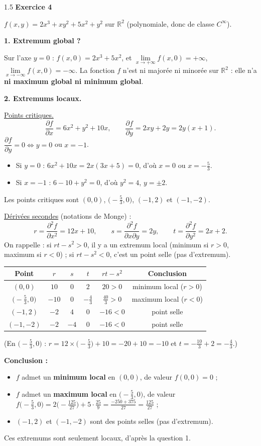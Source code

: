 \documentclass[12pt]{article}
\begin{document}
\begin{spacing}{1.5}
\medskip\textbf{Exercice 4}

$f(x,y)=2x^3+xy^2+5x^2+y^2$ sur $\mathbb{R}^2$ (polynomiale, donc de classe $C^\infty$).

\textbf{1. Extremum global ?}

Sur l'axe $y=0$ : $f(x,0)=2x^3+5x^2$, et $\lim\limits_{x\to+\infty}f(x,0)=+\infty$, $\lim\limits_{x\to-\infty}f(x,0)=-\infty$. La fonction $f$ n'est ni majorée ni minorée sur $\mathbb{R}^2$ : elle n'a \textbf{ni maximum global ni minimum global}.

\textbf{2. Extremums locaux.}

\underline{Points critiques.}
\[
\frac{\partial f}{\partial x}=6x^2+y^2+10x,\qquad \frac{\partial f}{\partial y}=2xy+2y=2y(x+1).
\]
$\dfrac{\partial f}{\partial y}=0\iff y=0$ ou $x=-1$.
\begin{itemize}
\item Si $y=0$ : $6x^2+10x=2x(3x+5)=0$, d'où $x=0$ ou $x=-\frac53$.
\item Si $x=-1$ : $6-10+y^2=0$, d'où $y^2=4$, $y=\pm2$.
\end{itemize}
Les points critiques sont $(0,0)$, $\big(-\frac53,0\big)$, $(-1,2)$ et $(-1,-2)$.

\underline{Dérivées secondes} (notations de Monge) :
\[
r=\frac{\partial^2f}{\partial x^2}=12x+10,\qquad s=\frac{\partial^2f}{\partial x\partial y}=2y,\qquad t=\frac{\partial^2f}{\partial y^2}=2x+2 .
\]
On rappelle : si $rt-s^2>0$, il y a un extremum local (minimum si $r>0$, maximum si $r<0$) ; si $rt-s^2<0$, c'est un point selle (pas d'extremum).

\begin{center}
\begin{tabular}{|c|c|c|c|c|c|}
\hline
Point & $r$ & $s$ & $t$ & $rt-s^2$ & Conclusion\\
\hline
$(0,0)$ & $10$ & $0$ & $2$ & $20>0$ & minimum local ($r>0$)\\
\hline
$\big(-\frac53,0\big)$ & $-10$ & $0$ & $-\frac43$ & $\frac{40}{3}>0$ & maximum local ($r<0$)\\
\hline
$(-1,2)$ & $-2$ & $4$ & $0$ & $-16<0$ & point selle\\
\hline
$(-1,-2)$ & $-2$ & $-4$ & $0$ & $-16<0$ & point selle\\
\hline
\end{tabular}
\end{center}
(En $\big(-\frac53,0\big)$ : $r=12\times\big(-\frac53\big)+10=-20+10=-10$ et $t=-\frac{10}{3}+2=-\frac43$.)

\textbf{Conclusion :}
\begin{itemize}
\item $f$ admet un \textbf{minimum local} en $(0,0)$, de valeur $f(0,0)=0$ ;
\item $f$ admet un \textbf{maximum local} en $\big(-\frac53,0\big)$, de valeur $f\big(-\frac53,0\big)=2\big(-\frac{125}{27}\big)+5\cdot\frac{25}{9}=\frac{-250+375}{27}=\frac{125}{27}$ ;
\item $(-1,2)$ et $(-1,-2)$ sont des points selles (pas d'extremum).
\end{itemize}
Ces extremums sont seulement locaux, d'après la question 1.

\end{spacing}
\end{document}
